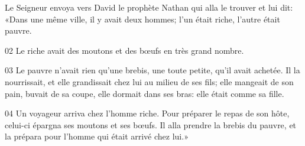 Le Seigneur envoya vers David le prophète Nathan qui alla le trouver et lui dit: «Dans une même ville, il y avait deux hommes; l’un était riche, l’autre était pauvre.

02 Le riche avait des moutons et des bœufs en très grand nombre.

03 Le pauvre n’avait rien qu’une brebis, une toute petite, qu’il avait achetée. Il la nourrissait, et elle grandissait chez lui au milieu de ses fils; elle mangeait de son pain, buvait de sa coupe, elle dormait dans ses bras: elle était comme sa fille.

04 Un voyageur arriva chez l’homme riche. Pour préparer le repas de son hôte, celui-ci épargna ses moutons et ses bœufs. Il alla prendre la brebis du pauvre, et la prépara pour l’homme qui était arrivé chez lui.»
